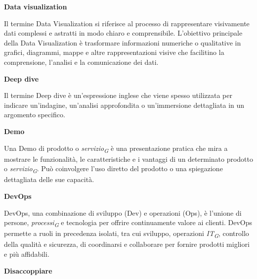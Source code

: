 \documentclass{article}
\begin{document}
\textbf{Data visualization}

\vspace{0.1cm}

Il termine Data Visualization si riferisce al processo di rappresentare visivamente dati complessi e astratti in modo chiaro e comprensibile. L'obiettivo principale della Data Visualization è trasformare informazioni numeriche o qualitative in grafici, diagrammi, mappe e altre rappresentazioni visive che facilitino la comprensione, l'analisi e la comunicazione dei dati. 

\vspace{0.4cm}

\textbf{Deep dive}

\vspace{0.1cm}

Il termine Deep dive è un'espressione inglese che viene spesso utilizzata per indicare un'indagine, un'analisi approfondita o un'immersione dettagliata in un argomento specifico.

\vspace{0.4cm}

\textbf{Demo}

\vspace{0.1cm}

Una Demo di prodotto o \textit{servizio}\textsubscript{\textit{G}} è una presentazione pratica che mira a mostrare le funzionalità, le caratteristiche e i vantaggi di un determinato prodotto o \textit{servizio}\textsubscript{\textit{G}}. Può coinvolgere l'uso diretto del prodotto o una spiegazione dettagliata delle sue capacità.

\vspace{0.4cm}

\textbf{DevOps}

\vspace{0.1cm}

DevOps, una combinazione di sviluppo (Dev) e operazioni (Ops), è l'unione di persone, \textit{processi}\textsubscript{\textit{G}} e tecnologia per offrire continuamente valore ai clienti. DevOps permette a ruoli in precedenza isolati, tra cui sviluppo, operazioni \textit{IT}\textsubscript{\textit{G}}, controllo della qualità e sicurezza, di coordinarsi e collaborare per fornire prodotti migliori e più affidabili.

\vspace{0.4cm}

\textbf{Disaccoppiare}

\vspace{0.1cm}
\end{document}
